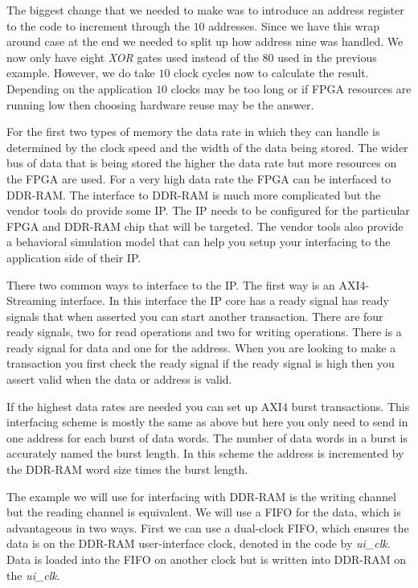 The biggest change that we needed to make was to introduce an address register to the code to increment through the $10$ addresses. Since we have this wrap around case at the end we needed to split up how address nine was handled. We now only have eight \emph{XOR} gates used instead of the $80$ used in the previous example. However, we do take $10$ clock cycles now to calculate the result. Depending on the application $10$ clocks may be too long or if \ac{FPGA} resources are running low then choosing hardware reuse may be the answer. 
	
For the first two types of memory the data rate in which they can handle is determined by the clock speed and the width of the data being stored. The wider bus of data that is being stored the higher the data rate but more resources on the \ac{FPGA} are used. For a very high data rate the \ac{FPGA} can be interfaced to \ac{DDR}-\ac{RAM}. The interface to \ac{DDR}-\ac{RAM} is much more complicated but the vendor tools do provide some \ac{IP}. The \ac{IP} needs to be configured for the particular \ac{FPGA} and \ac{DDR}-\ac{RAM} chip that will be targeted. The vendor tools also provide a behavioral simulation model that can help you setup your interfacing to the application side of their \ac{IP}. 

There two common ways to interface to the \ac{IP}. The first way is an \ac{AXI4}-Streaming interface. In this interface the \ac{IP} core has a ready signal has ready signals that when asserted you can start another transaction. There are four ready signals, two for read operations and two for writing operations. There is a ready signal for data and one for the address. When you are looking to make a transaction you first check the ready signal if the ready signal is high then you assert valid when the data or address is valid. 

If the highest data rates are needed you can set up \ac{AXI4} burst transactions. This interfacing scheme is mostly the same as above but here you only need to send in one address for each burst of data words. The number of data words in a burst is accurately named the burst length. In this scheme the address is incremented by the \ac{DDR}-\ac{RAM} word size times the burst length.  

The example we will use for interfacing with \ac{DDR}-\ac{RAM} is the writing channel but the reading channel is equivalent. We will use a \ac{FIFO} for the data, which is advantageous in two ways. First we can use a dual-clock \ac{FIFO}, which ensures the data is on the \ac{DDR}-\ac{RAM} user-interface clock, denoted in the code by \emph{ui\_clk}. Data is loaded into the \ac{FIFO} on another clock but is written into \ac{DDR}-\ac{RAM} on the \emph{ui\_clk}. 


